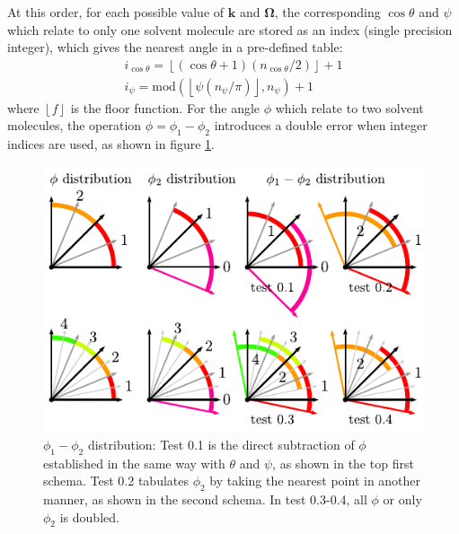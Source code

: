 At this order, for each possible value of $\mathbf{k}$ and $\mathbf{\Omega}$,
the corresponding $\cos\theta$ and $\psi$ which relate to only one
solvent molecule are stored as an index (single precision integer),
which gives the nearest angle in a pre-defined table:
\begin{equation}
\begin{array}{l}
i_{\cos\theta}=\left\lfloor (\cos\theta+1)(n_{\cos\theta}/2)\right\rfloor +1\\
i_{\psi}=\mathrm{mod}(\left\lfloor \psi(n_{\psi}/\pi)\right\rfloor ,n_{\psi})+1
\end{array}
\end{equation}
where $\left\lfloor f\right\rfloor $ is the floor function. For the
angle $\phi$ which relate to two solvent molecules, the operation
$\phi=\phi_{1}-\phi_{2}$ introduces a double error when integer indices
are used, as shown in figure \ref{fig:diff_phi}.

\begin{figure}[h]
\begin{centering}
\includegraphics{_figure/diff_phi}
\par\end{centering}
\caption[$\phi_{1}-\phi_{2}$ distribution]{$\phi_{1}-\phi_{2}$ distribution: Test 0.1 is the direct subtraction
of $\phi$ established in the same way with $\theta$ and $\psi$,
as shown in the top first schema. Test 0.2 tabulates $\phi_{2}$ by
taking the nearest point in another manner, as shown in the second
schema. In test 0.3-0.4, all $\phi$ or only $\phi_{2}$ is doubled.\label{fig:diff_phi}}
\end{figure}

